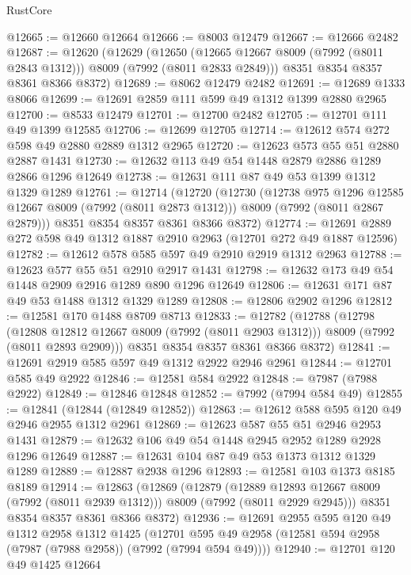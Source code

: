 \begin{lexlean}{RustCore}
\begin{coremodule}
@12665 := @12660 @12664
@12666 := @8003 @12479
@12667 := @12666 @2482
@12687 := @12620
    (@12629
      (@12650 (@12665 @12667 @8009 (@7992 (@8011 @2843 @1312))) @8009 (@7992 (@8011 @2833 @2849)))
      @8351
      @8354
      @8357
      @8361
      @8366
      @8372)
@12689 := @8062 @12479 @2482
@12691 := @12689 @1333 @8066
@12699 := @12691 @2859 @111 @599 @49 @1312 @1399 @2880 @2965
@12700 := @8533 @12479
@12701 := @12700 @2482
@12705 := @12701 @111 @49 @1399 @12585
@12706 := @12699 @12705
@12714 := @12612 @574 @272 @598 @49 @2880 @2889 @1312 @2965
@12720 := @12623 @573 @55 @51 @2880 @2887 @1431
@12730 := @12632 @113 @49 @54 @1448 @2879 @2886 @1289 @2866 @1296 @12649
@12738 := @12631 @111 @87 @49 @53 @1399 @1312 @1329 @1289
@12761 := @12714
    (@12720
      (@12730
        (@12738 @975 @1296 @12585 @12667 @8009 (@7992 (@8011 @2873 @1312)))
        @8009
        (@7992 (@8011 @2867 @2879)))
      @8351
      @8354
      @8357
      @8361
      @8366
      @8372)
@12774 := @12691 @2889 @272 @598 @49 @1312 @1887 @2910 @2963 (@12701 @272 @49 @1887 @12596)
@12782 := @12612 @578 @585 @597 @49 @2910 @2919 @1312 @2963
@12788 := @12623 @577 @55 @51 @2910 @2917 @1431
@12798 := @12632 @173 @49 @54 @1448 @2909 @2916 @1289 @890 @1296 @12649
@12806 := @12631 @171 @87 @49 @53 @1488 @1312 @1329 @1289
@12808 := @12806 @2902 @1296
@12812 := @12581 @170 @1488 @8709 @8713
@12833 := @12782
    (@12788
      (@12798
        (@12808 @12812 @12667 @8009 (@7992 (@8011 @2903 @1312)))
        @8009
        (@7992 (@8011 @2893 @2909)))
      @8351
      @8354
      @8357
      @8361
      @8366
      @8372)
@12841 := @12691 @2919 @585 @597 @49 @1312 @2922 @2946 @2961
@12844 := @12701 @585 @49 @2922
@12846 := @12581 @584 @2922
@12848 := @7987 (@7988 @2922)
@12849 := @12846 @12848
@12852 := @7992 (@7994 @584 @49)
@12855 := @12841 (@12844 (@12849 @12852))
@12863 := @12612 @588 @595 @120 @49 @2946 @2955 @1312 @2961
@12869 := @12623 @587 @55 @51 @2946 @2953 @1431
@12879 := @12632 @106 @49 @54 @1448 @2945 @2952 @1289 @2928 @1296 @12649
@12887 := @12631 @104 @87 @49 @53 @1373 @1312 @1329 @1289
@12889 := @12887 @2938 @1296
@12893 := @12581 @103 @1373 @8185 @8189
@12914 := @12863
    (@12869
      (@12879
        (@12889 @12893 @12667 @8009 (@7992 (@8011 @2939 @1312)))
        @8009
        (@7992 (@8011 @2929 @2945)))
      @8351
      @8354
      @8357
      @8361
      @8366
      @8372)
@12936 := @12691
    @2955
    @595
    @120
    @49
    @1312
    @2958
    @1312
    @1425
    (@12701 @595 @49 @2958 (@12581 @594 @2958 (@7987 (@7988 @2958)) (@7992 (@7994 @594 @49))))
@12940 := @12701 @120 @49 @1425 @12664

\end{coremodule}
\end{lexlean}
